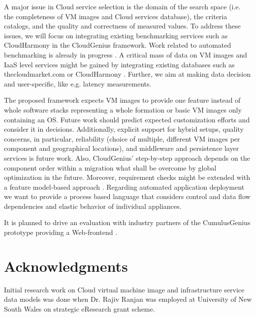 \documentclass[10pt]{article}
\begin{document}
A major issue in Cloud service selection is the domain of the search space (i.e. the completeness of VM images and Cloud services database), the criteria catalogs, and the quality and correctness of measured values. To address these issues, we will focus on integrating existing benchmarking services such as CloudHarmony \cite{cloudharmony2011} in the CloudGenius framework. Work related to automated benchmarking is already in progress \cite{haak2011autonomic}. A critical mass of data on VM images and IaaS level services might be gained by integrating existing databases such as thecloudmarket.com \cite{cloudmarket2011} or CloudHarmony \cite{cloudharmony2011}. Further, we aim at making data decision and user-specific, like e.g. latency measurements. 

The proposed framework expects VM images to provide one feature instead of whole software stacks representing a whole formation or basic VM images only containing an OS. Future work should predict expected customization efforts and consider it in decisions. Additionally, explicit support for hybrid setups, quality concerns, in particular, reliability (choice of multiple, different VM images per component and geographical locations), and middleware and persistence layer services is future work. Also, CloudGenius' step-by-step approach depends on the component order within a migration what shall be overcome by global optimization in the future.  Moreover, requirement checks might be extended with a feature model-based approach \cite{wittern2011use}. Regarding automated application deployment we want to provide a process based language that considers control and data flow dependencies and elastic behavior of individual appliances.

It is planned to drive an evaluation with industry partners of the CumulusGenius prototype providing a Web-frontend \cite{cumulusgeniusonline2011}.









\section{Acknowledgments}
Initial research work on Cloud virtual machine image and infrastructure service data models was done when Dr. Rajiv Ranjan was employed at University of New South Wales on strategic eResearch grant scheme. 





\end{document}
